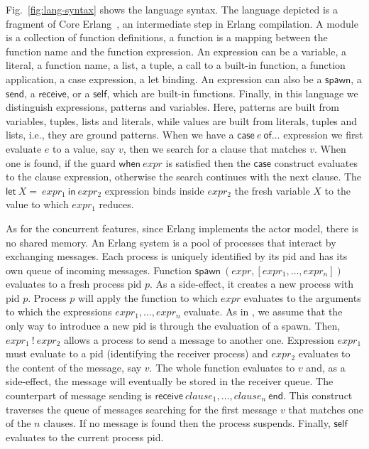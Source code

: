 \documentclass[runningheads]{llncs}
\newcommand{\ms}[1]{\mathsf{#1}}
\begin{document}
Fig.~\ref{fig:lang-syntax} shows the language syntax. The language depicted is a fragment of Core Erlang~\cite{core}, an intermediate step in Erlang compilation. A module is a collection of function definitions, a function is a mapping between the function name and the function expression. An expression can be a variable, a literal, a function name, a list, a tuple, a call to a built-in function, a function application, a case expression, a let binding. An expression can also be a $\ms{spawn}$, a $\ms{send}$, a $\ms{receive}$, or a $\ms{self}$, which are built-in functions. Finally, in this language we distinguish expressions, patterns and variables. Here, patterns are built from variables, tuples, lists and literals, while values are built from literals, tuples and lists, i.e., they are ground patterns.
When we have a $\ms{case}~e~\ms{of} \ldots$ expression we first evaluate $e$ to a value, say $v$, then we search for a clause that matches $v$. When one is found, if the guard $\ms{when}~expr$ is satisfied then the $\ms{case}$ construct evaluates to the clause expression, otherwise the search continues with the next clause. The $\ms{let}~X=~expr_1~\ms{in}~expr_2$ expression binds inside $expr_2$ the fresh variable $X$ to the value to which $expr_1$ reduces.

As for the concurrent features, since Erlang implements the actor model, there is no shared memory. An Erlang system is a pool of processes that interact by exchanging messages. Each process is uniquely identified by its pid and has its own queue of incoming messages. Function $\ms{spawn}~(expr, [expr_1, \ldots, expr_n])$ evaluates to a fresh process pid $p$.
As a side-effect, it creates a new process with pid $p$. Process $p$ will apply the function to which $expr$ evaluates to the arguments to which the expressions $expr_1, \ldots, expr_n$ evaluate.
As in \cite{LaneseNPV18}, we assume that the only way to introduce a new pid is through the evaluation of a spawn. Then, $expr_1~!~expr_2$ allows a process to send a message to another one. Expression $expr_1$ must evaluate to a pid (identifying the receiver process) and $expr_2$ evaluates to the content of the message, say $v$. The whole function evaluates to $v$ and, as a side-effect, the message will eventually be stored in the receiver queue. The counterpart of message sending is $\ms{receive}~clause_1, \ldots, clause_n~\ms{end}$. This construct traverses the queue of messages searching for the first message $v$ that matches one of the $n$ clauses. If no message is found then the process suspends. Finally, $\ms{self}$ evaluates to the current process pid.
\end{document}
